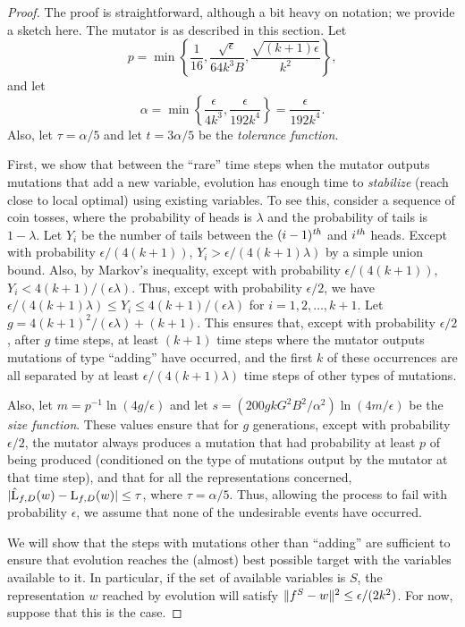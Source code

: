 \begin{proof} The proof is straightforward, although a bit heavy on notation; we
provide a sketch here. The mutator is as described in this section. Let
\[ p = \min \left\{ \frac{1}{16}, \frac{\sqrt{\epsilon}}{64 k^3 B},
\frac{\sqrt{(k+1)\epsilon}}{k^2} \right\}, \]
and let
\[ \alpha = \min \left\{ \frac{\epsilon}{4k^3}, \frac{\epsilon}{192k^4} \right\}
= \frac{\epsilon}{192k^4}. \]
Also, let $\tau = \alpha/5$ and let $t = 3\alpha/5$ be the \emph{tolerance
function}.

First, we show that between the ``rare'' time steps when the mutator outputs
mutations that add a new variable, evolution has enough time to \emph{stabilize}
(reach close to local optimal) using existing variables. To see this, consider a
sequence of coin tosses, where the probability of heads is $\lambda$ and the
probability of tails is $1 - \lambda$. Let $Y_i$ be the number of tails between
the $(i-1){^{\textit{th}}}$ and $i{^{\textit{th}}}$ heads. Except with probability $\epsilon/(4(k+1))$,
$Y_i > \epsilon/(4(k+1)\lambda)$ by a simple union bound.  Also, by Markov's
inequality, except with probability $\epsilon/(4(k+1))$, $Y_i <
4(k+1)/(\epsilon\lambda)$. Thus, except with probability $\epsilon/2$, we have
$\epsilon/(4(k+1)\lambda) \leq Y_i \leq 4(k+1)/(\epsilon\lambda)$ for $i = 1, 2,
\ldots, k+1$. Let $g = 4(k+1)^2/(\epsilon\lambda) + (k+1)$. This ensures that,
except with probability $\epsilon/2$, after $g$ time steps, at least $(k+1)$
time steps where the mutator outputs mutations of type ``adding'' have occurred,
and the first $k$ of these occurrences are all separated by at least
$\epsilon/(4(k+1) \lambda)$ time steps of other types of mutations.

Also, let $m = p^{-1}\ln(4g/\epsilon)$ and let $s = (200gkG^2B^2/\alpha^2)
\ln(4m/\epsilon)$ be the \emph{size function}.  These values ensure that for
$g$ generations, except with probability $\epsilon/2$, the mutator always
produces a mutation that had probability at least $p$ of being produced
(conditioned on the type of mutations output by the mutator at that time step),
and that for all the representations concerned, $|\hat{\mathrm{L}}_{f, D}(w) -
\mathrm{L}_{f, D}(w)| \leq \tau$, where $\tau = \alpha/5$. Thus, allowing the process
to fail with probability $\epsilon$, we assume that none of the undesirable
events have occurred.

We will show that the steps with mutations other than ``adding'' are sufficient
to ensure that evolution reaches the (almost) best possible target with the
variables available to it. In particular, if the set of available variables is
$S$, the representation $w$ reached by evolution will satisfy $\Vert f^S -
w \Vert^2 \leq \epsilon/(2k^2)$. For now, suppose that this is the case. 


\end{proof}
